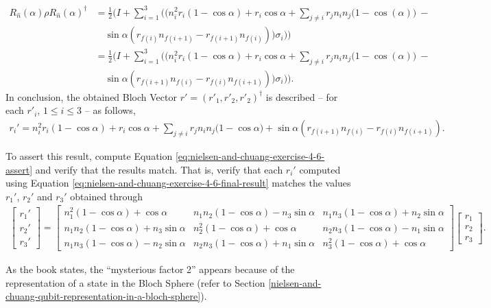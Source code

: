 \begin{align}
    R_{\hat n}(\alpha) \rho R_{\hat n}(\alpha)^\dagger &= \frac{1}{2} \Bigg(
        I + \sum_{i = 1}^3 \bigg( \Big(
            n_i^2r_i(1 - \cos\alpha) +
            r_i \cos\alpha +
            \sum_{j \neq i} r_j n_i n_j \big(
                 1 - \cos(\alpha)
            \big)\ - \nonumber \\
            &\quad
            \sin\alpha (r_{f(i)}n_{f(i + 1)} - r_{f(i+1)}n_{f(i)})
        \Big) \sigma_i \bigg)
    \Bigg)
    \\
    &= \frac{1}{2} \Bigg(
        I + \sum_{i = 1}^3 \bigg( \Big(
            n_i^2r_i(1 - \cos\alpha) +
            r_i \cos\alpha +
            \sum_{j \neq i} r_j n_i n_j \big(
                 1 - \cos(\alpha)
            \big)\ - \nonumber \\
            &\quad
            \sin\alpha (r_{f(i+1)}n_{f(i)} - r_{f(i)}n_{f(i + 1)})
        \Big) \sigma_i \bigg)
    \Bigg).
\end{align}
In conclusion,
the obtained Bloch Vector $r' = (r'_1, r'_2, r'_2)^\dagger$ is described --
for each $r'_i$, $1 \leq i \leq 3$ -- as follows,
\begin{align}
    r_i' = n_i^2r_i(1 - \cos\alpha) +
            r_i \cos\alpha +
            \sum_{j \neq i} r_j n_i n_j \big(
                1 - \cos\alpha
            \big) +
            \sin\alpha (r_{f(i+1)}n_{f(i)} - r_{f(i)}n_{f(i + 1)}) .
    \label{eq:nielsen-and-chuang-exercise-4-6-final-result}
\end{align}

To assert this result, compute Equation \ref{eq:nielsen-and-chuang-exercise-4-6-assert}
and verify that the results match.
That is, verify that each $r_i'$ computed using
Equation \ref{eq:nielsen-and-chuang-exercise-4-6-final-result} matches
the values $r_1'$, $r_2'$ and $r_3'$ obtained through
\begin{align}
    \left[ \begin{matrix}
        r_1' \\ r_2' \\ r_3'
    \end{matrix} \right] =
    \left[ \begin{matrix}
        n_1^2 (1 - \cos\alpha) + \cos\alpha &
        n_1 n_2 (1 - \cos\alpha) - n_3 \sin\alpha &
        n_1 n_3 (1 - \cos\alpha) + n_2 \sin\alpha
        \\
        n_1 n_2 (1 - \cos\alpha) + n_3 \sin\alpha &
        n_2^2 (1 - \cos\alpha) + \cos\alpha &
        n_2 n_3 (1 - \cos\alpha) - n_1 \sin\alpha
        \\
        n_1 n_3 (1 - \cos\alpha) - n_2 \sin\alpha &
        n_2 n_3 (1 - \cos\alpha) + n_1 \sin\alpha &
        n_3^2 (1 - \cos\alpha) + \cos\alpha
    \end{matrix} \right]
    \left[ \begin{matrix}
        r_1 \\ r_2 \\ r_3
    \end{matrix} \right].
\end{align}

As the book states,
the ``mysterious factor 2'' appears because of the
representation of a state in the Bloch Sphere
(refer to Section
\ref{nielsen-and-chuang-qubit-representation-in-a-bloch-sphere}).